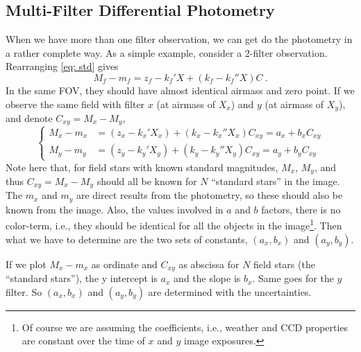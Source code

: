 \subsection{Multi-Filter Differential Photometry}
When we have more than one filter observation, we can get do the photometry in a rather complete way. As a simple example, consider a 2-filter observation. Rearranging \cref{eq: std} gives
\begin{equation}
  M_f - m_f = z_f - k_f' X + (k_f - k_f''X) C ~.
\end{equation}
In the same FOV, they should have almost identical airmass and zero point. If we observe the same field with filter $ x $ (at airmass of $ X_x $) and $ y $ (at airmass of $ X_y $), and denote $ C_{xy} = M_x - M_y $,
\begin{equation}
\begin{cases}
  M_x - m_x &= (z_x - k_x' X_x) + (k_x - k_x''X_x) C_{xy} = a_x + b_x C_{xy} \\
  M_y - m_y &= (z_y - k_y' X_y) + (k_y - k_y''X_y) C_{xy} = a_y + b_y C_{xy} 
\end{cases}
\end{equation}
Note here that, for field stars with known standard magnitudes, $ M_x $, $ M_y $, and thus $ C_{xy} = M_x - M_y $ should all be known for $ N $ ``standard stars'' in the image. The $ m_x $ and $ m_y $ are direct results from the photometry, so these should also be known from the image. Also, the values involved in $ a $ and $ b $ factors, there is no color-term, i.e., they should be identical for all the objects in the image\footnote{Of course we are assuming the coefficients, i.e., weather and CCD properties are constant over the time of $ x $ and $ y $ image exposures.}. Then what we have to determine are the two sets of constants, $ (a_x, b_x) $ and $ (a_y, b_y) $. 

If we plot $ M_x - m_x $ as ordinate and $ C_{xy} $ as abscissa for $ N $ field stars (the ``standard stars''), the y intercept is $ a_x $ and the slope is $ b_x $. Same goes for the $ y $ filter. So  $ (a_x, b_x) $ and $ (a_y, b_y) $ are determined with the uncertainties.


